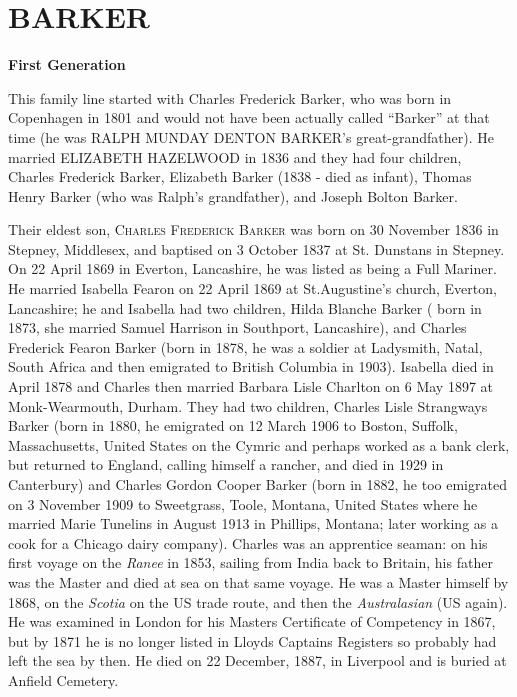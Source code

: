 \section{BARKER}

\textbf{First Generation}

This family line started with Charles Frederick Barker, who was born in Copenhagen in 1801 and would not have been actually called ``Barker'' at that time (he was \uppercase{Ralph Munday Denton Barker}'s great-grandfather). He married  \uppercase{Elizabeth Hazelwood} in 1836 and they had four children,  Charles Frederick Barker, Elizabeth Barker (1838 - died as infant), Thomas Henry Barker (who was Ralph's grandfather), and Joseph Bolton Barker.

Their eldest son,  \textsc{Charles Frederick Barker} was born on 30 November 1836 in Stepney, Middlesex, and baptised on 3 October 1837 at St. Dunstans in Stepney. On 22 April 1869 in Everton, Lancashire, he was listed as being a Full Mariner. He married Isabella Fearon on 22 April 1869 at St.Augustine's church,	Everton, Lancashire; he and Isabella had two children, Hilda Blanche Barker ( born in 1873, she married Samuel Harrison in Southport, Lancashire), and Charles Frederick Fearon Barker (born in 1878, he was a soldier at Ladysmith, Natal, South Africa and then emigrated to British Columbia in 1903). Isabella died in April 1878 and Charles then married Barbara Lisle Charlton on 6 May 1897 at Monk-Wearmouth, Durham. They had two children, Charles Lisle Strangways Barker (born in 1880, he emigrated on 12 March 1906 to	Boston, Suffolk, Massachusetts, United States on the Cymric and perhaps worked as a bank clerk, but returned to England, calling himself a rancher, and died in 1929 in Canterbury) and Charles Gordon Cooper Barker (born in 1882, he too emigrated on 3 November 1909 to	Sweetgrass, Toole, Montana, United States where he married Marie Tunelins in August 1913 in Phillips, Montana; later working as a cook for a Chicago dairy company).
Charles was an apprentice seaman: on his first voyage on the \textit{Ranee} in 1853, sailing from India back to Britain, his father was the Master and died at sea on that same voyage. He was a Master himself by 1868, on the \textit{Scotia} on the US trade route, and then the \textit{Australasian} (US again). He was examined in London for his Masters Certificate of Competency in 1867, but by 1871 he is no longer listed in Lloyds Captains Registers so probably had left the sea by then. He died on 22 December, 1887,  in Liverpool and is buried at Anfield Cemetery.

